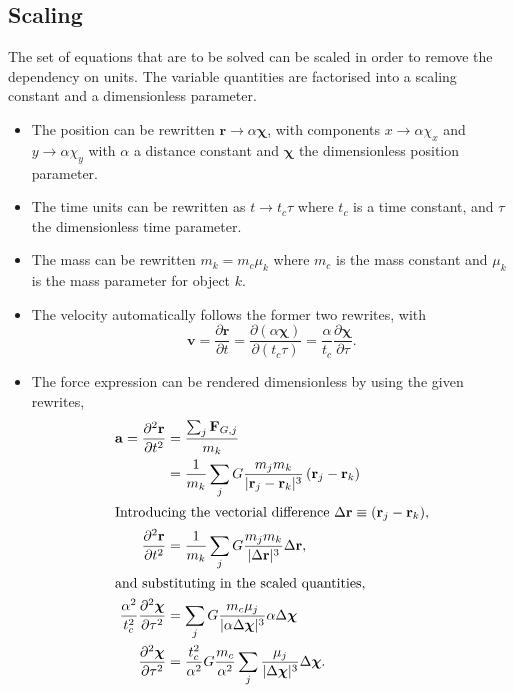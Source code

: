 \documentclass[a4paper,11pt]{article}
\begin{document}
\subsection{Scaling}
The set of equations that are to be solved can be scaled in order to remove the dependency on units. The variable quantities are factorised into a scaling constant and a dimensionless parameter.

\begin{itemize}
    \item The position can be rewritten $\mathbf{r} \to \alpha \boldsymbol{\chi}$, with components $x \to \alpha \chi_x$ and $y \to \alpha \chi_y$ with $\alpha$ a distance constant and $\boldsymbol{\chi}$ the dimensionless position parameter.

    \item The time units can be rewritten as $t \to t_c \tau$ where $t_c$ is a time constant, and $\tau$ the dimensionless time parameter.

    \item The mass can be rewritten $m_k = m_c \mu_k$ where $m_c$ is the mass constant and $\mu_k$ is the mass parameter for object $k$.

    \item The velocity automatically follows the former two rewrites, with 
\[ \mathbf{v} = \frac{\partial \mathbf{r}}{\partial t} = \frac{\partial (\alpha \boldsymbol{\chi})}{\partial (t_c \tau)} = \frac{\alpha}{t_c} \frac{\partial \boldsymbol{\chi}}{\partial \tau}. \]

\item The force expression can be rendered dimensionless by using the given rewrites,
\begin{align*}
    \mathbf{a} = \frac{\partial^2 \mathbf{r}}{\partial t^2} &= \frac{\sum_j \mathbf{F}_{G,j}}{m_k} \\
    &= \frac{1}{m_k} \sum_j G \frac{m_j m_k}{| \mathbf{r}_j - \mathbf{r}_k |^3} \left( \mathbf{r}_j - \mathbf{r}_k \right) \\
    \intertext{Introducing the vectorial difference $\Delta \mathbf{r} \equiv \left( \mathbf{r}_j - \mathbf{r}_k \right)$,}
         \frac{\partial^2 \mathbf{r}}{\partial t^2} &= \frac{1}{m_k} \sum_j G \frac{m_j m_k}{| \Delta \mathbf{r} |^3} \Delta \mathbf{r}, \\
         \intertext{and substituting in the scaled quantities,}
    \frac{\alpha^2}{t_c^2} \frac{\partial^2 \boldsymbol{\chi}}{\partial \tau^2} &= \sum_j G \frac{m_c \mu_j}{|\alpha \Delta \boldsymbol{\chi}|^3} \alpha \Delta \boldsymbol{\chi} \\
    \frac{\partial^2 \boldsymbol{\chi}}{\partial \tau^2} &= \frac{t_c^2}{\alpha^2} G \frac{m_c}{\alpha^2} \sum_j \frac{\mu_j}{|\Delta \boldsymbol{\chi} |^3} \Delta \boldsymbol{\chi}. 
\end{align*}


\end{itemize}
\end{document}
